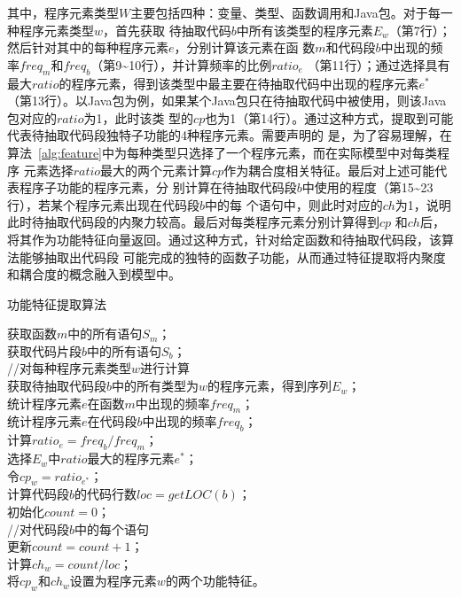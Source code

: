 其中，程序元素类型$W$主要包括四种：变量、类型、函数调用和Java包。对于每一种程序元素类型$w$，首先获取
待抽取代码$b$中所有该类型的程序元素$E_w$（第7行）；然后针对其中的每种程序元素$e$，分别计算该元素在函
数$m$和代码段$b$中出现的频率$freq_m$和$freq_b$（第9\textasciitilde10行），并计算频率的比例$ratio_e$
（第11行）；通过选择具有最大$ratio$的程序元素，得到该类型中最主要在待抽取代码中出现的程序元素$e^*$
（第13行）。以Java包为例，如果某个Java包只在待抽取代码中被使用，则该Java包对应的$ratio$为1，此时该类
型的$cp$也为1（第14行）。通过这种方式，提取到可能代表待抽取代码段独特子功能的4种程序元素。需要声明的
是，为了容易理解，在算法~\ref{alg:feature}中为每种类型只选择了一个程序元素，而在实际模型中对每类程序
元素选择$ratio$最大的两个元素计算$cp$作为耦合度相关特征。最后对上述可能代表程序子功能的程序元素，分
别计算在待抽取代码段$b$中使用的程度（第15\textasciitilde23行），若某个程序元素出现在代码段$b$中的每
个语句中，则此时对应的$ch$为1，说明此时待抽取代码段的内聚力较高。最后对每类程序元素分别计算得到$cp$
和$ch$后，将其作为功能特征向量返回。通过这种方式，针对给定函数和待抽取代码段，该算法能够抽取出代码段
可能完成的独特的函数子功能，从而通过特征提取将内聚度和耦合度的概念融入到模型中。

\begin{algorithm}[H]
\caption{功能特征提取算法}\label{alg:feature}
获取函数$m$中的所有语句$S_m$；\\
获取代码片段$b$中的所有语句$S_b$；\\
 {
  //对每种程序元素类型$w$进行计算\\
  获取待抽取代码段$b$中的所有类型为$w$的程序元素，得到序列$E_w$；\\
   {
    统计程序元素$e$在函数$m$中出现的频率$freq_m$；\\
    统计程序元素$e$在代码段$b$中出现的频率$freq_b$；\\
    计算$ratio_e = freq_b/freq_m$；\\
  }
  选择$E_w$中$ratio$最大的程序元素$e^*$；\\
  令$cp_w = ratio_{e^*}$；\\
  计算代码段$b$的代码行数$loc = getLOC(b)$；\\
  初始化$count = 0$；\\
   {
    //对代码段$b$中的每个语句\\
     {
      更新$count = count + 1$；\\
    }
  }
  计算$ch_w = count/loc$；\\
  将$cp_w$和$ch_w$设置为程序元素$w$的两个功能特征。\\
}
\end{algorithm}
